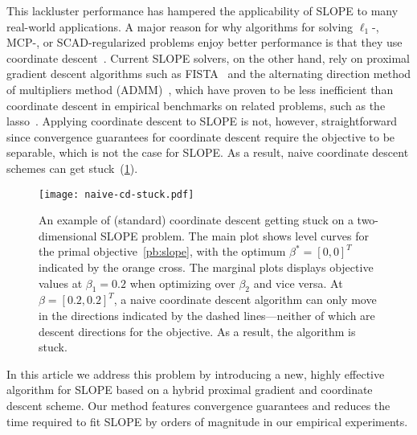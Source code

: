 This lackluster performance has hampered the applicability of SLOPE to many
real-world applications. A major reason for why algorithms for solving
$\ell_1$-, MCP-, or SCAD-regularized problems enjoy better performance is that
they use coordinate
descent~\cite{tseng2001convergence,friedman2010,breheny2011}. Current SLOPE
solvers, on the other hand, rely on proximal gradient descent algorithms such
as FISTA~\cite{beck2009} and the alternating direction method of multipliers
method (ADMM)~\cite{boyd2010}, which have proven to be less inefficient than
coordinate descent in empirical benchmarks on related problems, such as the
lasso~\cite{moreau2022benchopt}. Applying coordinate descent to SLOPE is not,
however, straightforward since convergence guarantees for coordinate descent
require the objective to be separable, which is not the case for SLOPE. As a
result, naive coordinate descent schemes can get
stuck~(\cref{fig:naive-cd-stuck}).

\begin{figure}[htpb]
  \centering
  \texttt{[image: naive-cd-stuck.pdf]}
  \caption{%
    An example of (standard) coordinate descent getting stuck on a two-dimensional SLOPE problem.
    The main plot shows level curves for the primal objective~\eqref{pb:slope}, with the optimum \(\beta^* = [0, 0]^T\) indicated by the orange cross.
    The marginal plots displays objective values at \(\beta_1 = 0.2\) when optimizing over \(\beta_2\) and vice versa.
    At \(\beta = [0.2,0.2]^T\), a naive coordinate descent algorithm can only move in the directions indicated by the dashed lines---neither of which are descent directions for the objective.
    As a result, the algorithm is stuck.
  }
  \label{fig:naive-cd-stuck}
\end{figure}


In this article we address this problem by introducing a new, highly effective
algorithm for SLOPE based on a hybrid proximal gradient and coordinate descent
scheme. Our method features convergence guarantees and reduces the time
required to fit SLOPE by orders of magnitude in our empirical experiments.
